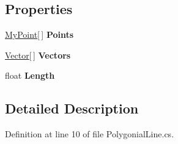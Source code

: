 \subsection*{Properties}
\begin{DoxyCompactItemize}
\item 
\hyperlink{class_simulation_core_1_1_math_tool_1_1_geometric_classes_1_1_my_point}{My\+Point}\mbox{[}$\,$\mbox{]} {\bfseries Points}\hypertarget{class_simulation_core_1_1_math_tool_1_1_geometric_classes_1_1_polygonial_line_aa82b5ddf46660ad5d134e5c35dc201ea}{}\label{class_simulation_core_1_1_math_tool_1_1_geometric_classes_1_1_polygonial_line_aa82b5ddf46660ad5d134e5c35dc201ea}

\item 
\hyperlink{class_simulation_core_1_1_math_tool_1_1_geometric_classes_1_1_vector}{Vector}\mbox{[}$\,$\mbox{]} {\bfseries Vectors}\hypertarget{class_simulation_core_1_1_math_tool_1_1_geometric_classes_1_1_polygonial_line_a5a952d963ac1d70099c5ca4fd4bec310}{}\label{class_simulation_core_1_1_math_tool_1_1_geometric_classes_1_1_polygonial_line_a5a952d963ac1d70099c5ca4fd4bec310}

\item 
float {\bfseries Length}\hypertarget{class_simulation_core_1_1_math_tool_1_1_geometric_classes_1_1_polygonial_line_af5f585645db96c2c2f4e3a49da618a33}{}\label{class_simulation_core_1_1_math_tool_1_1_geometric_classes_1_1_polygonial_line_af5f585645db96c2c2f4e3a49da618a33}

\end{DoxyCompactItemize}


\subsection{Detailed Description}


Definition at line 10 of file Polygonial\+Line.\+cs.

